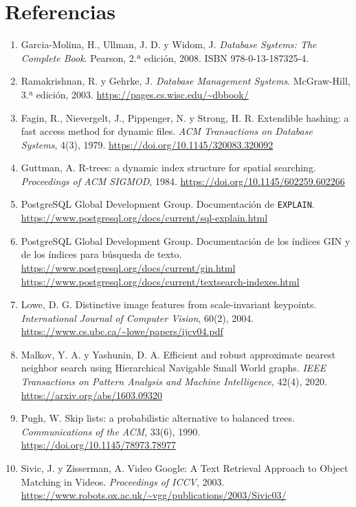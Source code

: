 \documentclass[11pt,a4paper]{article}
\begin{document}
\section*{Referencias}
\begin{enumerate}
  \item Garcia-Molina, H., Ullman, J. D. y Widom, J. \emph{Database Systems: The Complete Book}. Pearson, 2.ª edición, 2008. ISBN 978-0-13-187325-4.
  \item Ramakrishnan, R. y Gehrke, J. \emph{Database Management Systems}. McGraw-Hill, 3.ª edición, 2003. \url{https://pages.cs.wisc.edu/~dbbook/}
  \item Fagin, R., Nievergelt, J., Pippenger, N. y Strong, H. R. Extendible hashing: a fast access method for dynamic files. \emph{ACM Transactions on Database Systems}, 4(3), 1979. \url{https://doi.org/10.1145/320083.320092}
  \item Guttman, A. R-trees: a dynamic index structure for spatial searching. \emph{Proceedings of ACM SIGMOD}, 1984. \url{https://doi.org/10.1145/602259.602266}
  \item PostgreSQL Global Development Group. Documentación de \texttt{EXPLAIN}.\\ \url{https://www.postgresql.org/docs/current/sql-explain.html}
  \item PostgreSQL Global Development Group. Documentación de los índices GIN y de los índices para búsqueda de texto.\\ \url{https://www.postgresql.org/docs/current/gin.html}\\ \url{https://www.postgresql.org/docs/current/textsearch-indexes.html}
  \item Lowe, D. G. Distinctive image features from scale-invariant keypoints. \emph{International Journal of Computer Vision}, 60(2), 2004. \url{https://www.cs.ubc.ca/~lowe/papers/ijcv04.pdf}
  \item Malkov, Y. A. y Yashunin, D. A. Efficient and robust approximate nearest neighbor search using Hierarchical Navigable Small World graphs. \emph{IEEE Transactions on Pattern Analysis and Machine Intelligence}, 42(4), 2020. \url{https://arxiv.org/abs/1603.09320}
  \item Pugh, W. Skip lists: a probabilistic alternative to balanced trees. \emph{Communications of the ACM}, 33(6), 1990. \url{https://doi.org/10.1145/78973.78977}
  \item Sivic, J. y Zisserman, A. Video Google: A Text Retrieval Approach to Object Matching in Videos. \emph{Proceedings of ICCV}, 2003. \url{https://www.robots.ox.ac.uk/~vgg/publications/2003/Sivic03/}

\end{enumerate}
\end{document}
